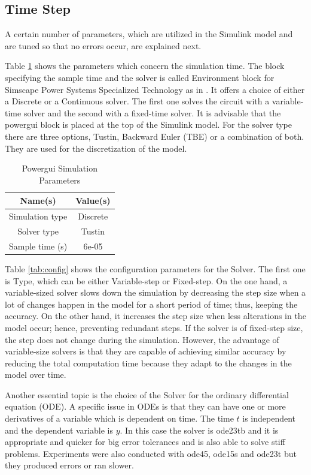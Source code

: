 \subsection{Time Step}

A certain number of parameters, which are utilized in the Simulink model and are tuned so that no errors occur, are explained next. 

Table \ref{tab:powergui} shows the parameters which concern the simulation time. The block specifying the sample time and the solver is called Environment block for Simscape Power Systems Specialized Technology as in \citet{powerguiMatlab}. It offers a choice of either a Discrete or a Continuous solver. The first one solves the circuit with a variable-time solver and the second with a fixed-time solver. It is advisable that the powergui block is placed at the top of the Simulink model. For the solver type there are three options, Tustin, Backward Euler (TBE) or a combination of both. They are used for the discretization of the model.

\begin{table}
\centering
\begin{tabular}{ |c|c| } 
 \hline
 Name(s) & Value(s) \\
 \hline\hline
 Simulation type & Discrete  \\ 
 Solver type & Tustin \\ 
 Sample time (s) & 6e-05 \\ 
 \hline
\end{tabular}
\caption{Powergui Simulation Parameters}
\label{tab:powergui}
\end{table}

Table \ref{tab:config} shows the configuration parameters for the Solver. The first one is Type, which can be either Variable-step or Fixed-step. On the one hand, a variable-sized solver slows down the simulation by decreasing the step size when a lot of changes happen in the model for a short period of time; thus, keeping the accuracy. On the other hand, it increases the step size when less alterations in the model occur; hence, preventing redundant steps. If the solver is of fixed-step size, the step does not change during the simulation. However, the advantage of variable-size solvers is that they are capable of achieving similar accuracy by reducing the total computation time because they adapt to the changes in the model over time.

Another essential topic is the choice of the Solver for the ordinary differential equation (ODE). A specific issue in ODEs is that they can have one or more derivatives of a variable which is dependent on time. The time $t$ is independent and the dependent variable is $y$. In this case the solver is ode23tb and it is appropriate and quicker for big error tolerances and is also able to solve stiff problems. Experiments were also conducted with ode45, ode15s and ode23t but they produced errors or ran slower.


